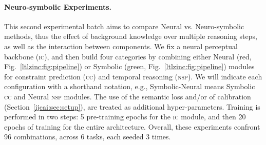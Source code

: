 \paragraph{Neuro-symbolic Experiments.}
This second experimental batch aims to compare Neural vs. Neuro-symbolic methods, thus the effect of background knowledge over multiple reasoning steps, as well as the interaction between components.
We fix a neural perceptual backbone (\textsc{ic}), and then build four categories by combining either Neural (red, Fig.~\ref{ltlzinc:fig:pipeline}) or Symbolic (green, Fig.~\ref{ltlzinc:fig:pipeline}) modules for constraint prediction (\textsc{cc}) and temporal reasoning (\textsc{nsp}). %
We will indicate each configuration with a shorthand notation, e.g., Symbolic-Neural means Symbolic \textsc{cc} and Neural \textsc{nsp} modules.
%
The use of the semantic loss and/or of calibration (Section~\ref{ijcai:sec:setup}), are treated as additional hyper-parameters.
Training is performed in two steps: 5 pre-training epochs for the \textsc{ic} module, and then 20 epochs of training for the entire architecture. Overall, these experiments confront 96 combinations, across 6 tasks, each seeded 3 times.


